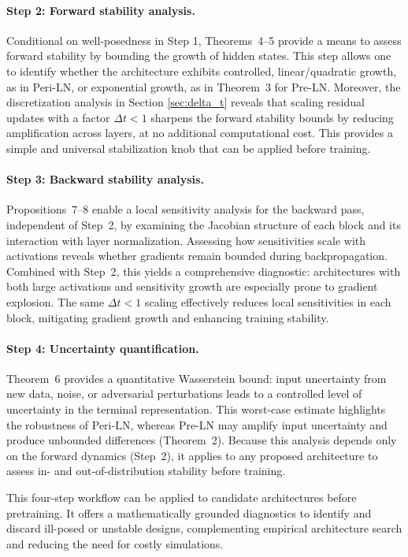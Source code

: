 \documentclass[journal]{IEEEtran}
\theoremstyle{plain}
\theoremstyle{definition}
\theoremstyle{remark}
\begin{document}
\paragraph{Step 2: Forward stability analysis.} 
Conditional on well-posedness in Step 1, Theorems~4--5 provide a means to assess forward stability by bounding the growth of hidden states. This step allows one to identify whether the architecture exhibits controlled, linear/quadratic growth, as in Peri-LN, or exponential growth, as in Theorem~3 for Pre-LN. Moreover, the discretization analysis in Section \ref{sec:delta_t} reveals that scaling residual updates with a factor $\Delta t<1$ sharpens the forward stability bounds by reducing amplification across layers, at no additional computational cost. This provides a simple and universal stabilization knob that can be applied before training.

\paragraph{Step 3: Backward stability analysis.} 
Propositions~7--8 enable a local sensitivity analysis for the backward pass, independent of Step~2, by examining the Jacobian structure of each block and its interaction with layer normalization. Assessing how sensitivities scale with activations reveals whether gradients remain bounded during backpropagation. Combined with Step~2, this yields a comprehensive diagnostic: architectures with both large activations and sensitivity growth are especially prone to gradient explosion. The same $\Delta t < 1$ scaling effectively reduces local sensitivities in each block, mitigating gradient growth and enhancing training stability.

\paragraph{Step 4: Uncertainty quantification.} 
Theorem~6 provides a quantitative Wasserstein bound: input uncertainty from new data, noise, or adversarial perturbations leads to a controlled level of uncertainty in the terminal representation. This worst-case estimate highlights the robustness of Peri-LN, whereas Pre-LN may amplify input uncertainty and produce unbounded differences (Theorem~2). Because this analysis depends only on the forward dynamics (Step~2), it applies to any proposed architecture to assess in- and out-of-distribution stability before training.

This four-step workflow can be applied to candidate architectures before pretraining. It offers a mathematically grounded diagnostics to identify and discard ill-posed or unstable designs, complementing empirical architecture search and reducing the need for costly simulations. 
\end{document}
